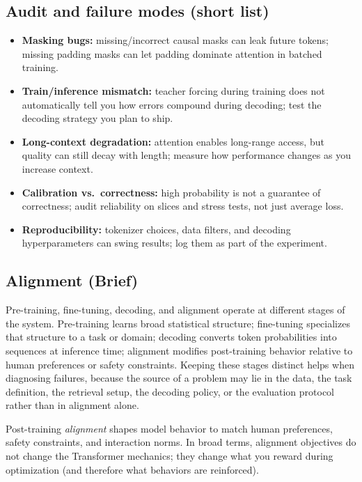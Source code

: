 \subsection{Audit and failure modes (short list)}
\label{sec:transformers_audit_and_failure_modes}
\begin{tcolorbox}[summarybox, title={Audit and failure modes (engineering view)}]
\begin{itemize}
    \item \textbf{Masking bugs:} missing/incorrect causal masks can leak future tokens; missing padding masks can let padding dominate attention in batched training.
    \item \textbf{Train/inference mismatch:} teacher forcing during training does not automatically tell you how errors compound during decoding; test the decoding strategy you plan to ship.
    \item \textbf{Long-context degradation:} attention enables long-range access, but quality can still decay with length; measure how performance changes as you increase context.
    \item \textbf{Calibration vs.\ correctness:} high probability is not a guarantee of correctness; audit reliability on slices and stress tests, not just average loss.
    \item \textbf{Reproducibility:} tokenizer choices, data filters, and decoding hyperparameters can swing results; log them as part of the experiment.
\end{itemize}
\end{tcolorbox}

\subsection{Alignment (Brief)}
\label{sec:transformers_alignment_brief}
Pre-training, fine-tuning, decoding, and alignment operate at different stages of the system. Pre-training learns broad statistical structure; fine-tuning specializes that structure to a task or domain; decoding converts token probabilities into sequences at inference time; alignment modifies post-training behavior relative to human preferences or safety constraints. Keeping these stages distinct helps when diagnosing failures, because the source of a problem may lie in the data, the task definition, the retrieval setup, the decoding policy, or the evaluation protocol rather than in alignment alone.

Post-training \emph{alignment} shapes model behavior to match human preferences, safety constraints, and interaction norms. In broad terms, alignment objectives do not change the Transformer mechanics; they change what you reward during optimization (and therefore what behaviors are reinforced).

